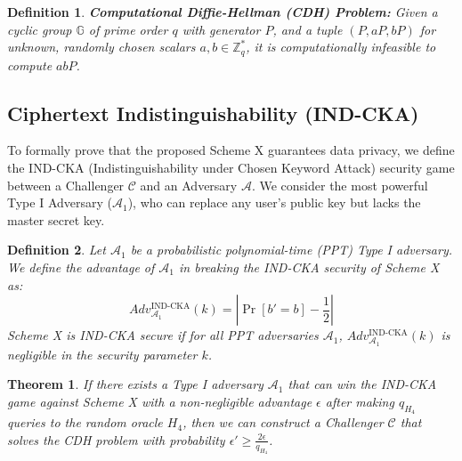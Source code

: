 \documentclass[10pt,journal,compsoc]{IEEEtran}
\newtheorem{theorem}{Theorem}
\newtheorem{definition}{Definition}
\begin{document}
\begin{definition}
\textbf{Computational Diffie-Hellman (CDH) Problem:} Given a cyclic group $\mathbb{G}$ of prime order $q$ with generator $P$, and a tuple $(P, aP, bP)$ for unknown, randomly chosen scalars $a, b \in \mathbb{Z}_q^*$, it is computationally infeasible to compute $abP$.
\end{definition}

\subsection{Ciphertext Indistinguishability (IND-CKA)}

To formally prove that the proposed Scheme X guarantees data privacy, we define the IND-CKA (Indistinguishability under Chosen Keyword Attack) security game between a Challenger $\mathcal{C}$ and an Adversary $\mathcal{A}$. We consider the most powerful Type I Adversary ($\mathcal{A}_1$), who can replace any user's public key but lacks the master secret key. 

\begin{definition}
Let $\mathcal{A}_1$ be a probabilistic polynomial-time (PPT) Type I adversary. We define the advantage of $\mathcal{A}_1$ in breaking the IND-CKA security of Scheme X as:
\begin{equation}
    Adv_{\mathcal{A}_1}^{\text{IND-CKA}}(k) = \left| \Pr[b' = b] - \frac{1}{2} \right|
\end{equation}
Scheme X is IND-CKA secure if for all PPT adversaries $\mathcal{A}_1$, $Adv_{\mathcal{A}_1}^{\text{IND-CKA}}(k)$ is negligible in the security parameter $k$.
\end{definition}

\begin{theorem}
If there exists a Type I adversary $\mathcal{A}_1$ that can win the IND-CKA game against Scheme X with a non-negligible advantage $\epsilon$ after making $q_{H_4}$ queries to the random oracle $H_4$, then we can construct a Challenger $\mathcal{C}$ that solves the CDH problem with probability $\epsilon' \ge \frac{2\epsilon}{q_{H_4}}$.
\end{theorem}
\end{document}
